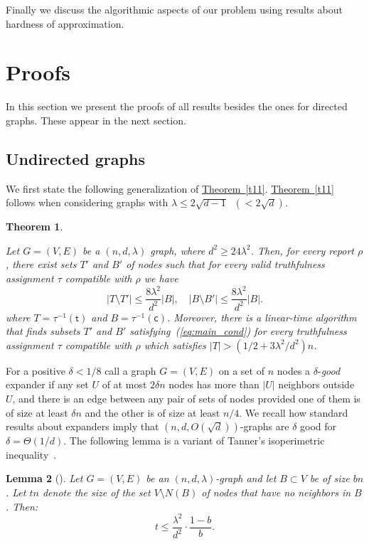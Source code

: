 \documentclass[11pt]{article}
\numberwithin{equation}{section}
\newtheorem{theorem}{Theorem}[section]
\newtheorem{lemma}[theorem]{Lemma}
\theoremstyle{definition}
\theoremstyle{plain}
\newcommand{\expref}[2]{\hyperref[#2]{#1~\ref{#2}}}
\begin{document}
Finally we discuss the algorithmic aspects of our problem 
using results about hardness of approximation.


\section{Proofs} \label{sec:proofs} 

In this section we present the proofs of all results besides the ones
for directed graphs. These appear in the next section.

\subsection{Undirected graphs} 
\label{subsec:undirected}
We first state the following generalization of \expref{Theorem}{t11}. 
\expref{Theorem}{t11} follows when considering graphs 
with $\lambda \leq 2 \sqrt{d-1}  \;\;(< 2 \sqrt d)$. 

\begin{theorem}
\label{t21}

Let $G = (V,E)$ be a $(n,d,\lambda)$ graph, where
$d^2 \geq 24 \lambda^2$.  
Then, for every report
$\rho$, there exist sets $T'$ and $B'$ of nodes
such that for every valid truthfulness assignment
$\tau$ compatible with $\rho$ we have
\begin{equation}
\label{eq:main_cond}
|T \setminus T'| \leq \frac{8 \lambda^2}{d^2} |B| , \quad 
|B \setminus B'| \leq  \frac{8 \lambda^2}{d^2} |B|.
\end{equation}
where $T = \tau^{-1}(\mathsf{t})$ and $B =  \tau^{-1}(\mathsf{c})$.
%
Moreover, there is a linear-time
algorithm that finds subsets $T'$ and
$B'$ satisfying~(\ref{eq:main_cond})
for every
truthfulness assignment $\tau$
compatible with $\rho$ which
satisfies
$|T|>(1/2+3\lambda^2/d^2)n$.
%
\end{theorem}


For a positive $\delta<1/8$
call a graph $G=(V,E)$ on a set of $n$ nodes a
$\delta$-\emph{good}
expander if any set $U$ of at most $2 \delta n$ nodes has 
more than $|U|$ neighbors outside $U$, and there is an edge between
any pair of sets of nodes provided one of them is of
size at least $\delta n$ and the other is of size at least 
$n/4$.
We recall how standard results about expanders 
%
imply that $(n,d,O(\sqrt{d}))$-graphs are $\delta$ good 
for $\delta = \Theta(1/d)$. 
%
%
%
The following lemma is a variant of Tanner's isoperimetric
inequality~\cite{tanner}.
\begin{lemma}[{\cite[Corollary 1]{ABNNR}}]
 \label{cor:expand}
Let $G=(V,E)$ be an $(n,d,\lambda)$-graph and let $B \subset V$ be of size 
$b n$. Let $t n$ denote the size of the set $V \setminus N(B)$
of nodes that have no neighbors in $B$. Then:
\begin{equation}  \label{eq:nonneighbors}
t \leq \frac{\lambda^2}{d^2}\cdot\frac{1-b}{b}.
\end{equation}
\end{lemma}
\end{document}
